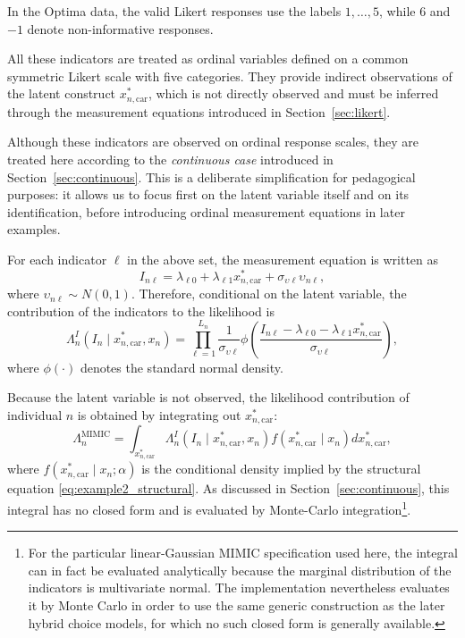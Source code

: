 \documentclass[12pt,a4paper]{article}
\begin{document}
In the Optima data, the valid Likert responses use the labels
\(1,\ldots,5\), while \(6\) and \(-1\) denote non-informative
responses.

All these indicators are treated as ordinal variables defined on a
common symmetric Likert scale with five categories. They provide
indirect observations of the latent construct \(x^*_{n,\text{car}}\),
which is not directly observed and must be inferred through the
measurement equations introduced in Section~\ref{sec:likert}.

Although these indicators are observed on ordinal response scales,
they are treated here according to the \emph{continuous case}
introduced in Section~\ref{sec:continuous}. This is a deliberate
simplification for pedagogical purposes: it allows us to focus first
on the latent variable itself and on its identification, before
introducing ordinal measurement equations in later examples.

For each indicator \(\ell\) in the above set, the measurement equation
is written as
\begin{equation}
  \label{eq:example2_measurement}
  I_{n\ell} = \lambda_{\ell 0} + \lambda_{\ell 1} x^*_{n,\text{car}} +
  \sigma_{\upsilon \ell} \upsilon_{n\ell},
\end{equation}
where \(\upsilon_{n\ell} \sim N(0,1)\). Therefore, conditional on the
latent variable, the contribution of the indicators to the likelihood
is
\begin{equation}
  \label{eq:example2_conditional_likelihood}
  \Lambda_n^{I}\!\left(I_n \mid x^*_{n,\text{car}},x_n\right) =
  \prod_{\ell=1}^{L_n} \frac{1}{\sigma_{\upsilon\ell}}
\phi\left( \frac{ I_{n\ell} - \lambda_{\ell 0}
    - \lambda_{\ell 1} x^*_{n,\text{car}} }{\sigma_{\upsilon \ell}}
  \right),
\end{equation}
where \(\phi(\cdot)\) denotes the standard normal density.

Because the latent variable is not observed, the likelihood
contribution of individual \(n\) is obtained by integrating out
\(x^*_{n,\text{car}}\):
\begin{equation}
  \label{eq:example2_unconditional_likelihood}
  \Lambda_n^{\text{MIMIC}} = \int_{x^*_{n,\text{car}}} \Lambda_n^{I}\!\left(I_n
  \mid x^*_{n,\text{car}},x_n\right) f\!\left(x^*_{n,\text{car}} \mid
  x_n\right) dx^*_{n,\text{car}},
\end{equation}
where \(f(x^*_{n,\text{car}} \mid x_n;\alpha)\) is the conditional density
implied by the structural equation \eqref{eq:example2_structural}. As
discussed in Section~\ref{sec:continuous}, this integral has no closed
form and is evaluated by Monte-Carlo integration\footnote{For the particular linear-Gaussian MIMIC specification used
here, the integral can in fact be evaluated analytically because the
marginal distribution of the indicators is multivariate normal. The
implementation nevertheless evaluates it by Monte Carlo in order to
use the same generic construction as the later hybrid choice models,
for which no such closed form is generally available.}.
\end{document}
